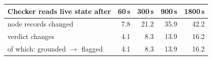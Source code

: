 \begin{tabular}{lrrrr}
\toprule
Checker reads live state after & 60\,s & 300\,s & 900\,s & 1800\,s \\
\midrule
node records changed & 7.8 & 21.2 & 35.9 & 42.2 \\
verdict changes & 4.1 & 8.3 & 13.9 & 16.2 \\
\quad of which: grounded $\to$ flagged & 4.1 & 8.3 & 13.9 & 16.2 \\
\bottomrule
\end{tabular}